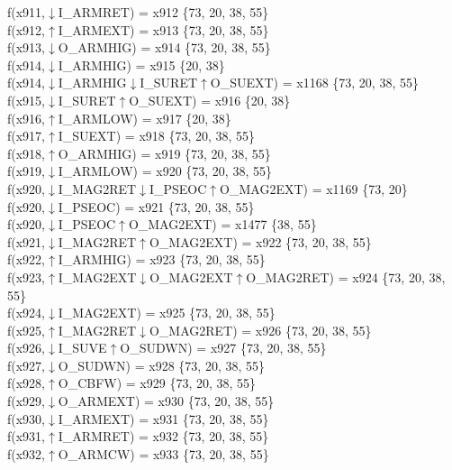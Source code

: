 f(x911,$\downarrow$I\_ARMRET) = x912 \{73, 20, 38, 55\} \\  
f(x912,$\uparrow$I\_ARMEXT) = x913 \{73, 20, 38, 55\} \\  
f(x913,$\downarrow$O\_ARMHIG) = x914 \{73, 20, 38, 55\} \\  
f(x914,$\downarrow$I\_ARMHIG) = x915 \{20, 38\} \\  
f(x914,$\downarrow$I\_ARMHIG$\downarrow$I\_SURET$\uparrow$O\_SUEXT) = x1168 \{73, 20, 38, 55\} \\  
f(x915,$\downarrow$I\_SURET$\uparrow$O\_SUEXT) = x916 \{20, 38\} \\  
f(x916,$\uparrow$I\_ARMLOW) = x917 \{20, 38\} \\  
f(x917,$\uparrow$I\_SUEXT) = x918 \{73, 20, 38, 55\} \\  
f(x918,$\uparrow$O\_ARMHIG) = x919 \{73, 20, 38, 55\} \\  
f(x919,$\downarrow$I\_ARMLOW) = x920 \{73, 20, 38, 55\} \\  
f(x920,$\downarrow$I\_MAG2RET$\downarrow$I\_PSEOC$\uparrow$O\_MAG2EXT) = x1169 \{73, 20\} \\  
f(x920,$\downarrow$I\_PSEOC) = x921 \{73, 20, 38, 55\} \\  
f(x920,$\downarrow$I\_PSEOC$\uparrow$O\_MAG2EXT) = x1477 \{38, 55\} \\  
f(x921,$\downarrow$I\_MAG2RET$\uparrow$O\_MAG2EXT) = x922 \{73, 20, 38, 55\} \\  
f(x922,$\uparrow$I\_ARMHIG) = x923 \{73, 20, 38, 55\} \\  
f(x923,$\uparrow$I\_MAG2EXT$\downarrow$O\_MAG2EXT$\uparrow$O\_MAG2RET) = x924 \{73, 20, 38, 55\} \\  
f(x924,$\downarrow$I\_MAG2EXT) = x925 \{73, 20, 38, 55\} \\  
f(x925,$\uparrow$I\_MAG2RET$\downarrow$O\_MAG2RET) = x926 \{73, 20, 38, 55\} \\  
f(x926,$\downarrow$I\_SUVE$\uparrow$O\_SUDWN) = x927 \{73, 20, 38, 55\} \\  
f(x927,$\downarrow$O\_SUDWN) = x928 \{73, 20, 38, 55\} \\  
f(x928,$\uparrow$O\_CBFW) = x929 \{73, 20, 38, 55\} \\  
f(x929,$\downarrow$O\_ARMEXT) = x930 \{73, 20, 38, 55\} \\  
f(x930,$\downarrow$I\_ARMEXT) = x931 \{73, 20, 38, 55\} \\  
f(x931,$\uparrow$I\_ARMRET) = x932 \{73, 20, 38, 55\} \\  
f(x932,$\uparrow$O\_ARMCW) = x933 \{73, 20, 38, 55\} \\  
